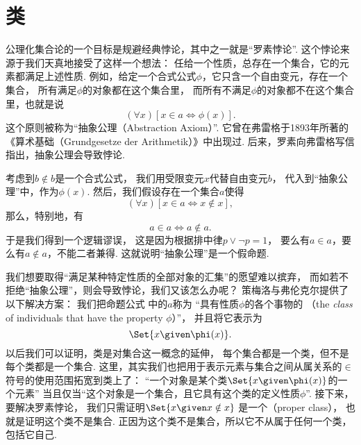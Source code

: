 
\section{类}
公理化集合论的一个目标是规避经典悖论，其中之一就是“罗素悖论”.
这个悖论来源于我们天真地接受了这样一个想法：
任给一个性质，总存在一个集合，它的元素都满足上述性质.
例如，给定一个合式公式\(\phi\)，它只含一个自由变元，存在一个集合，
所有满足\(\phi\)的对象都在这个集合里，
而所有不满足\(\phi\)的对象都不在这个集合里，也就是说
\begin{equation}\label{equation:集合论.类的逻辑表示}
	(\forall x)[x \in a \iff \phi(x)].
\end{equation}
这个原则被称为“抽象公理（Abstraction Axiom）”.
它曾在弗雷格于1893年所著的《算术基础（Grundgesetze der Arithmetik）》中出现过.
后来，罗素向弗雷格写信指出，抽象公理会导致悖论.

考虑到\(b \notin b\)是一个合式公式，
我们用受限变元\(x\)代替自由变元\(b\)，
代入到“抽象公理”中，作为\(\phi(x)\).
然后，我们假设存在一个集合\(a\)使得\begin{equation*}
	(\forall x)[x \in a \iff x \notin x],
\end{equation*}
那么，特别地，有\begin{equation*}
	a \in a \iff a \notin a.
\end{equation*}
于是我们得到一个逻辑谬误，
这是因为根据排中律\(p \lor \neg p = 1\)，
要么有\(a \in a\)，要么有\(a \notin a\)，不能二者兼得.
这就说明“抽象公理”是一个假命题.

我们想要取得“满足某种特定性质的全部对象的汇集”的愿望难以摈弃，
而如若不拒绝“抽象公理”，则会导致悖论，我们又该怎么办呢？
策梅洛与弗伦克尔提供了以下解决方案：
我们把命题公式  中的\(a\)称为%
“具有性质\(\phi\)的各个事物的%
（the \emph{class} of individuals that have the property \(\phi\)）”，
并且将它表示为
\begin{equation}
	\Set{ x \given \phi(x) }.
\end{equation}
以后我们可以证明，类是对集合这一概念的延伸，
每个集合都是一个类，但不是每个类都是一个集合.
这里，其实我们也把用于表示元素与集合之间从属关系的\(\in\)符号的使用范围拓宽到类上了：
“一个对象是某个类\(\Set{ x \given \phi(x) }\)的一个元素”%
当且仅当“这个对象是一个集合，且它具有这个类的定义性质\(\phi\)”.
接下来，要解决罗素悖论，
我们只需证明\(\Set{ x \given x \notin x }\)%
是一个（proper class），
也就是证明这个类不是集合.
正因为这个类不是集合，所以它不从属于任何一个类，包括它自己.

